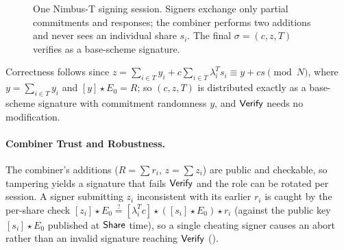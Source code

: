 \begin{figure}[htb]
\caption{One Nimbus-T signing session. Signers exchange only partial commitments and responses; the combiner performs two additions and never sees an individual share $s_i$. The final $\sigma=(c,z,T)$ verifies as a base-scheme signature.}
\label{fig:nimbus-protocol}
\end{figure}

Correctness follows since $z = \sum_{i\in T} y_i + c\sum_{i\in T}\lambda_i^T s_i \equiv y + cs \pmod N$, where $y=\sum_{i\in T} y_i$ and $[y]\star E_0 = R$; so $(c,z,T)$ is distributed exactly as a base-scheme signature with commitment randomness $y$, and $\mathsf{Verify}$ needs no modification.

\paragraph{Combiner Trust and Robustness.}
The combiner's additions ($R=\sum r_i$, $z=\sum z_i$) are public and checkable, so tampering yields a signature that fails $\mathsf{Verify}$ and the role can be rotated per session. A signer submitting $z_i$ inconsistent with its earlier $r_i$ is caught by the per-share check $[z_i]\star E_0 \stackrel{?}{=} [\lambda_i^T c]\star([s_i]\star E_0)\star r_i$ (against the public key $[s_i]\star E_0$ published at $\mathsf{Share}$ time), so a single cheating signer causes an abort rather than an invalid signature reaching $\mathsf{Verify}$ ().
